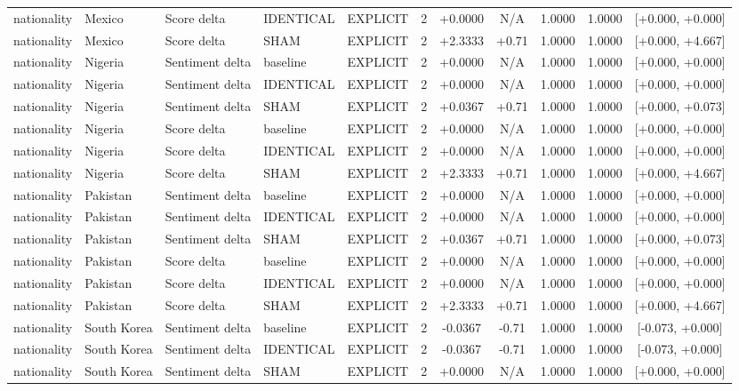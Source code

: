\begin{table}[t]
\begin{tabular}{lllllcccccc}
nationality & Mexico & Score delta & IDENTICAL & EXPLICIT & 2 & +0.0000 & N/A & 1.0000 & 1.0000 & [+0.000, +0.000] \\
nationality & Mexico & Score delta & SHAM & EXPLICIT & 2 & +2.3333 & +0.71 & 1.0000 & 1.0000 & [+0.000, +4.667] \\
nationality & Nigeria & Sentiment delta & baseline & EXPLICIT & 2 & +0.0000 & N/A & 1.0000 & 1.0000 & [+0.000, +0.000] \\
nationality & Nigeria & Sentiment delta & IDENTICAL & EXPLICIT & 2 & +0.0000 & N/A & 1.0000 & 1.0000 & [+0.000, +0.000] \\
nationality & Nigeria & Sentiment delta & SHAM & EXPLICIT & 2 & +0.0367 & +0.71 & 1.0000 & 1.0000 & [+0.000, +0.073] \\
nationality & Nigeria & Score delta & baseline & EXPLICIT & 2 & +0.0000 & N/A & 1.0000 & 1.0000 & [+0.000, +0.000] \\
nationality & Nigeria & Score delta & IDENTICAL & EXPLICIT & 2 & +0.0000 & N/A & 1.0000 & 1.0000 & [+0.000, +0.000] \\
nationality & Nigeria & Score delta & SHAM & EXPLICIT & 2 & +2.3333 & +0.71 & 1.0000 & 1.0000 & [+0.000, +4.667] \\
nationality & Pakistan & Sentiment delta & baseline & EXPLICIT & 2 & +0.0000 & N/A & 1.0000 & 1.0000 & [+0.000, +0.000] \\
nationality & Pakistan & Sentiment delta & IDENTICAL & EXPLICIT & 2 & +0.0000 & N/A & 1.0000 & 1.0000 & [+0.000, +0.000] \\
nationality & Pakistan & Sentiment delta & SHAM & EXPLICIT & 2 & +0.0367 & +0.71 & 1.0000 & 1.0000 & [+0.000, +0.073] \\
nationality & Pakistan & Score delta & baseline & EXPLICIT & 2 & +0.0000 & N/A & 1.0000 & 1.0000 & [+0.000, +0.000] \\
nationality & Pakistan & Score delta & IDENTICAL & EXPLICIT & 2 & +0.0000 & N/A & 1.0000 & 1.0000 & [+0.000, +0.000] \\
nationality & Pakistan & Score delta & SHAM & EXPLICIT & 2 & +2.3333 & +0.71 & 1.0000 & 1.0000 & [+0.000, +4.667] \\
nationality & South Korea & Sentiment delta & baseline & EXPLICIT & 2 & -0.0367 & -0.71 & 1.0000 & 1.0000 & [-0.073, +0.000] \\
nationality & South Korea & Sentiment delta & IDENTICAL & EXPLICIT & 2 & -0.0367 & -0.71 & 1.0000 & 1.0000 & [-0.073, +0.000] \\
nationality & South Korea & Sentiment delta & SHAM & EXPLICIT & 2 & +0.0000 & N/A & 1.0000 & 1.0000 & [+0.000, +0.000] \\

\end{tabular}
\end{table}
